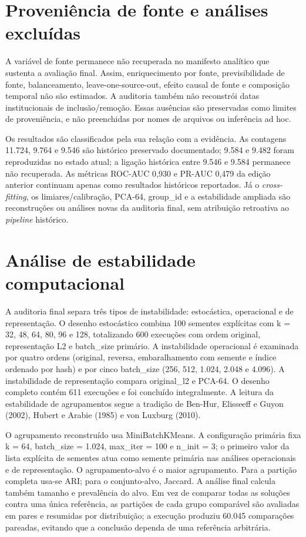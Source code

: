 
\section{Proveniência de fonte e análises excluídas}

A variável de fonte permanece não recuperada no manifesto analítico que sustenta a avaliação final. Assim, enriquecimento por fonte, previsibilidade de fonte, balanceamento, leave-one-source-out, efeito causal de fonte e composição temporal não são estimados. A auditoria também não reconstrói datas institucionais de inclusão/remoção. Essas ausências são preservadas como limites de proveniência, e não preenchidas por nomes de arquivos ou inferência ad hoc.

Os resultados são classificados pela sua relação com a evidência. As contagens 11.724, 9.764 e 9.546 são histórico preservado documentado; 9.584 e 9.482 foram reproduzidas no estado atual; a ligação histórica entre 9.546 e 9.584 permanece não recuperada. As métricas ROC-AUC 0,930 e PR-AUC 0,479 da edição anterior continuam apenas como resultados históricos reportados. Já o \emph{cross-fitting}, os limiares/calibração, PCA-64, group\_id e a estabilidade ampliada são reconstruções ou análises novas da auditoria final, sem atribuição retroativa ao \emph{pipeline} histórico.

\section{Análise de estabilidade computacional}

A auditoria final separa três tipos de instabilidade: estocástica, operacional e de representação. O desenho estocástico combina 100 sementes explícitas com k = 32, 48, 64, 80, 96 e 128, totalizando 600 execuções com ordem original, representação L2 e batch\_size primário. A instabilidade operacional é examinada por quatro ordens (original, reversa, embaralhamento com semente e índice ordenado por hash) e por cinco batch\_size (256, 512, 1.024, 2.048 e 4.096). A instabilidade de representação compara original\_l2 e PCA-64. O desenho completo contém 611 execuções e foi concluído integralmente. A leitura da estabilidade de agrupamentos segue a tradição de Ben-Hur, Elisseeff e Guyon (2002), Hubert e Arabie (1985) e von Luxburg (2010).

O agrupamento reconstruído usa MiniBatchKMeans. A configuração primária fixa k = 64, batch\_size = 1.024, max\_iter = 100 e n\_init = 3; o primeiro valor da lista explícita de sementes atua como semente primária nas análises operacionais e de representação. O agrupamento-alvo é o maior agrupamento. Para a partição completa usa-se ARI; para o conjunto-alvo, Jaccard. A análise final calcula também tamanho e prevalência do alvo. Em vez de comparar todas as soluções contra uma única referência, as partições de cada grupo comparável são avaliadas em pares e resumidas por distribuição; a execução produziu 60.045 comparações pareadas, evitando que a conclusão dependa de uma referência arbitrária.

